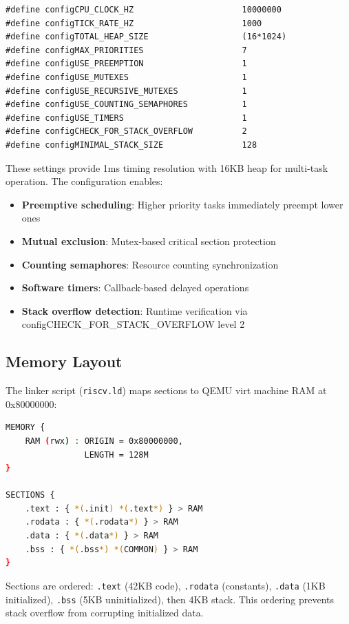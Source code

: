 \documentclass[conference]{IEEEtran}
\begin{document}
\begin{lstlisting}
#define configCPU_CLOCK_HZ                      10000000
#define configTICK_RATE_HZ                      1000
#define configTOTAL_HEAP_SIZE                   (16*1024)
#define configMAX_PRIORITIES                    7
#define configUSE_PREEMPTION                    1
#define configUSE_MUTEXES                       1
#define configUSE_RECURSIVE_MUTEXES             1
#define configUSE_COUNTING_SEMAPHORES           1
#define configUSE_TIMERS                        1
#define configCHECK_FOR_STACK_OVERFLOW          2
#define configMINIMAL_STACK_SIZE                128
\end{lstlisting}

These settings provide 1ms timing resolution with 16KB heap for multi-task operation. The configuration enables:
\begin{itemize}
    \item \textbf{Preemptive scheduling}: Higher priority tasks immediately preempt lower ones
    \item \textbf{Mutual exclusion}: Mutex-based critical section protection
    \item \textbf{Counting semaphores}: Resource counting synchronization
    \item \textbf{Software timers}: Callback-based delayed operations
    \item \textbf{Stack overflow detection}: Runtime verification via configCHECK\_FOR\_STACK\_OVERFLOW level 2
\end{itemize}

\subsection{Memory Layout}
The linker script (\texttt{riscv.ld}) maps sections to QEMU virt machine RAM at 0x80000000:

\begin{lstlisting}[language=bash]
MEMORY {
    RAM (rwx) : ORIGIN = 0x80000000, 
                LENGTH = 128M
}

SECTIONS {
    .text : { *(.init) *(.text*) } > RAM
    .rodata : { *(.rodata*) } > RAM
    .data : { *(.data*) } > RAM
    .bss : { *(.bss*) *(COMMON) } > RAM
}
\end{lstlisting}

Sections are ordered: \texttt{.text} (42KB code), \texttt{.rodata} (constants), \texttt{.data} (1KB initialized), \texttt{.bss} (5KB uninitialized), then 4KB stack. This ordering prevents stack overflow from corrupting initialized data.
\end{document}
